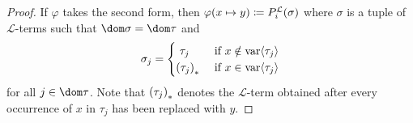 \begin{proof}
    \vspace{0.3cm}
    \noindent
    If \( \varphi \) takes the second form, then \( \folfreevariablereplacement{\varphi}{x}{y} \coloneq P^{\mathcal{L}}_{i}(\sigma) \)
    where \( \sigma \) is a tuple of \( \mathcal{L} \)-terms such that \( \dom \sigma = \dom \tau \) and
    \begin{equation}
        \label{eq:define-sigma-tuple-of-L-terms}
        \sigma_{j} =
        \begin{cases}
           \ \tau_{j} \ &\text{if} \ x \notin \folvars{\tau_{j}}\\
            \mleft( \tau_{j} \mright)_{\ast} \ &\text{if} \ x \in \folvars{\tau_{j}}
        \end{cases}
    \end{equation}
    for all \( j \in \dom \tau \).
    Note that \( \mleft( \tau_{j} \mright)_{\ast} \) denotes the \( \mathcal{L} \)-term obtained after every occurrence of \( x \) in \( \tau_{j} \) has been
    replaced with \( y \).


\end{proof}
